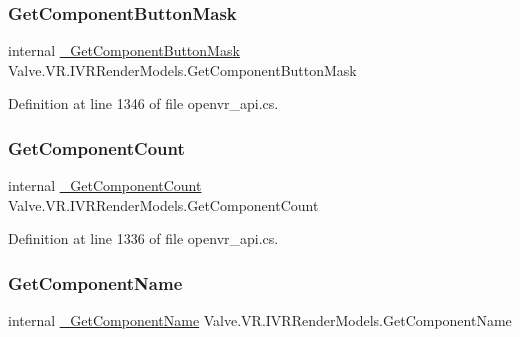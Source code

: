 \mbox{\label{struct_valve_1_1_v_r_1_1_i_v_r_render_models_a60dc144e8e593e6bec5830409089c238}} 
\subsubsection{\texorpdfstring{GetComponentButtonMask}{GetComponentButtonMask}}
{\footnotesize\ttfamily internal \mbox{\hyperlink{struct_valve_1_1_v_r_1_1_i_v_r_render_models_a5a1b0a485a820f88672d43c1ab53cf09}{\+\_\+\+Get\+Component\+Button\+Mask}} Valve.\+V\+R.\+I\+V\+R\+Render\+Models.\+Get\+Component\+Button\+Mask}



Definition at line 1346 of file openvr\+\_\+api.\+cs.

\mbox{\label{struct_valve_1_1_v_r_1_1_i_v_r_render_models_a1a8516b7e5c898a1653e5c7ace101558}} 
\subsubsection{\texorpdfstring{GetComponentCount}{GetComponentCount}}
{\footnotesize\ttfamily internal \mbox{\hyperlink{struct_valve_1_1_v_r_1_1_i_v_r_render_models_ad3a86004136474baa0217ed18c5b8af1}{\+\_\+\+Get\+Component\+Count}} Valve.\+V\+R.\+I\+V\+R\+Render\+Models.\+Get\+Component\+Count}



Definition at line 1336 of file openvr\+\_\+api.\+cs.

\mbox{\label{struct_valve_1_1_v_r_1_1_i_v_r_render_models_a7cc186fe1abfbb36dcb43515df428ce5}} 
\subsubsection{\texorpdfstring{GetComponentName}{GetComponentName}}
{\footnotesize\ttfamily internal \mbox{\hyperlink{struct_valve_1_1_v_r_1_1_i_v_r_render_models_aa62f5cca131966eaf77e1278e686d131}{\+\_\+\+Get\+Component\+Name}} Valve.\+V\+R.\+I\+V\+R\+Render\+Models.\+Get\+Component\+Name}



